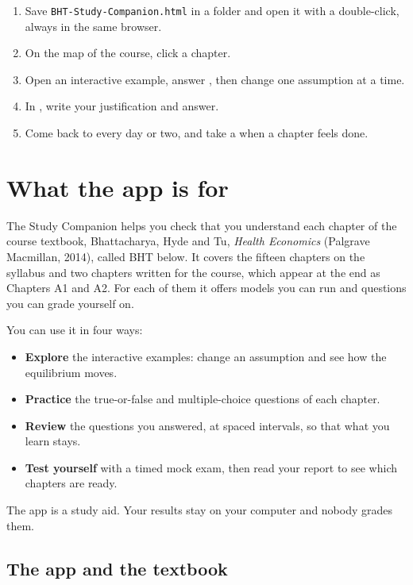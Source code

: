 
\begin{quickstart}
\begin{enumerate}[leftmargin=1.4em]
  \item Save \texttt{BHT-Study-Companion.html} in a folder and open it with a double-click, always in the same browser.
  \item On the map of the course, click a chapter.
  \item Open an interactive example, answer , then change one assumption at a time.
  \item In , write your justification and answer.
  \item Come back to  every day or two, and take a  when a chapter feels done.
\end{enumerate}
\end{quickstart}

\section{What the app is for}

The Study Companion helps you check that you understand each chapter of the course textbook, Bhattacharya, Hyde and Tu, \emph{Health Economics} (Palgrave Macmillan, 2014), called BHT below. It covers the fifteen chapters on the syllabus and two chapters written for the course, which appear at the end as Chapters A1 and A2. For each of them it offers models you can run and questions you can grade yourself on.

You can use it in four ways:
\begin{itemize}
  \item \textbf{Explore} the interactive examples: change an assumption and see how the equilibrium moves.
  \item \textbf{Practice} the true-or-false and multiple-choice questions of each chapter.
  \item \textbf{Review} the questions you answered, at spaced intervals, so that what you learn stays.
  \item \textbf{Test yourself} with a timed mock exam, then read your report to see which chapters are ready.
\end{itemize}
The app is a study aid. Your results stay on your computer and nobody grades them.

\subsection{The app and the textbook}

